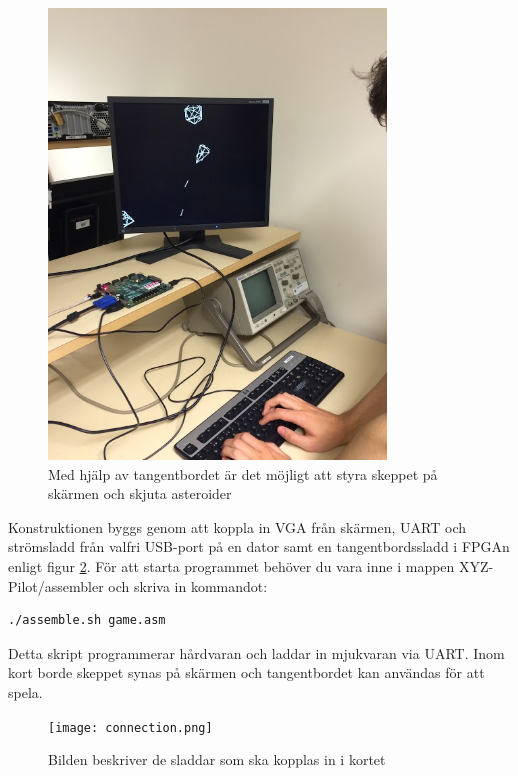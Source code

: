 \documentclass[a4paper]{article}
\begin{document}
    \begin{figure}[H]
        \centering
        \includegraphics[width=0.8\textwidth]{demo_img}
        \caption{Med hjälp av tangentbordet är det möjligt att styra skeppet på
        skärmen och skjuta asteroider\label{demo_img}}
    \end{figure}

    Konstruktionen byggs genom att koppla in VGA från skärmen, UART och
    strömsladd från valfri USB-port på en dator samt en tangentbordssladd i
    FPGAn enligt figur \ref{fig:connection}. För att starta programmet behöver du vara inne i
    mappen XYZ-Pilot/assembler och skriva in kommandot:
    
    \begin{lstlisting}[language=bash]
    ./assemble.sh game.asm
    \end{lstlisting}
 
    Detta skript programmerar hårdvaran och laddar in mjukvaran via UART. Inom
    kort borde skeppet synas på skärmen och tangentbordet kan användas för att
    spela. 

    \begin{figure}[H]
        \centering
        \texttt{[image: connection.png]}
        \caption{Bilden beskriver  de sladdar som ska kopplas in i kortet}
        \label{fig:connection}
    \end{figure}
\end{document}
